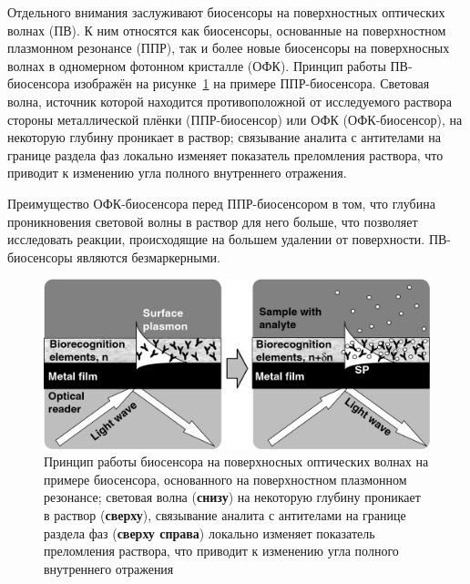 \documentclass[oneside,final,12pt]{extreport}
\begin{document}
Отдельного внимания заслуживают биосенсоры на поверхностных оптических волнах (ПВ).
К ним относятся как биосенсоры, основанные на поверхностном плазмонном резонансе (ППР),
так и более новые биосенсоры на поверхносных волнах в одномерном фотонном кристалле (ОФК).
Принцип работы ПВ-биосенсора изображён на рисунке~\ref{fig:spr_biosensor_principle}
на примере ППР-биосенсора.
Световая волна, источник которой находится противоположной от исследуемого раствора
стороны металлической плёнки (ППР-биосенсор) или ОФК (ОФК-биосенсор),
на некоторую глубину проникает в раствор;
связывание аналита с антителами на границе раздела фаз
локально изменяет показатель преломления раствора, что приводит к изменению
угла полного внутреннего отражения.

Преимущество ОФК-биосенсора перед ППР-биосенсором в том,
что глубина проникновения световой волны в раствор для него больше,
что позволяет исследовать реакции, происходящие
на большем удалении от поверхности.
ПВ-биосенсоры являются безмаркерными.


\begin{figure}
  \centering
  \includegraphics[width=.8\textwidth]{pic/spr_biosensor_principle}

  \caption{%
    \label{fig:spr_biosensor_principle}%
    Принцип работы биосенсора на поверхносных оптических волнах
    на примере биосенсора, основанного на поверхностном плазмонном резонансе;
    световая волна (\textbf{снизу}) на некоторую глубину проникает в раствор (\textbf{сверху}),
    связывание аналита с антителами на границе раздела фаз (\textbf{сверху справа})
    локально изменяет показатель преломления раствора, что приводит к изменению
    угла полного внутреннего отражения
  }

\end{figure}


\end{document}
